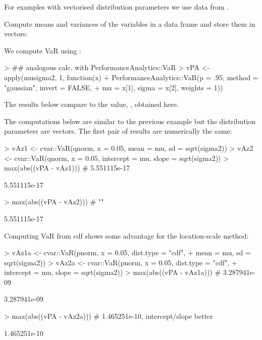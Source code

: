 \documentclass[nojss,article]{jss}
\begin{document}
For examples with vectorised distribution parameters we use data from
.

Compute means and variances of the variables in a data frame and store them in vectors:
\begin{Schunk}
\begin{Sinput}
> ## if(require("PerformanceAnalytics")){
> data(edhec, package = "PerformanceAnalytics")
> mu <- apply(edhec, 2, mean)
> sigma2 <- apply(edhec, 2, var)
> musigma2 <- cbind(mu, sigma2)
\end{Sinput}
\end{Schunk}

We compute VaR using :
\begin{Schunk}
\begin{Sinput}
> ## analogous calc. with PerformanceAnalytics::VaR
> vPA <- apply(musigma2, 1, function(x)
+     PerformanceAnalytics::VaR(p = .95, method = "gaussian", invert = FALSE,
+                               mu = x[1], sigma = x[2], weights = 1))
\end{Sinput}
\end{Schunk}
The results below compare to the value, , obtained here.

The computations below are similar to the previous example but the distribution parameters
are vectors. The first pair of results are numerically the same:
\begin{Schunk}
\begin{Sinput}
> vAz1 <- cvar::VaR(qnorm, x = 0.05, mean = mu, sd = sqrt(sigma2))
> vAz2 <- cvar::VaR(qnorm, x = 0.05, intercept = mu, slope = sqrt(sigma2))
> max(abs((vPA - vAz1))) # 5.551115e-17
\end{Sinput}
\begin{Soutput}
[1] 5.551115e-17
\end{Soutput}
\begin{Sinput}
> max(abs((vPA - vAz2))) #   ""
\end{Sinput}
\begin{Soutput}
[1] 5.551115e-17
\end{Soutput}
\end{Schunk}

Computing VaR from cdf shows some advantage for the location-scale method:
\begin{Schunk}
\begin{Sinput}
> vAz1a <- cvar::VaR(pnorm, x = 0.05, dist.type = "cdf",
+                    mean = mu, sd = sqrt(sigma2))
> vAz2a <- cvar::VaR(pnorm, x = 0.05, dist.type = "cdf",
+                    intercept = mu, slope = sqrt(sigma2))
> max(abs((vPA - vAz1a))) # 3.287941e-09
\end{Sinput}
\begin{Soutput}
[1] 3.287941e-09
\end{Soutput}
\begin{Sinput}
> max(abs((vPA - vAz2a))) #  1.465251e-10, intercept/slope better
\end{Sinput}
\begin{Soutput}
[1] 1.465251e-10
\end{Soutput}
\end{Schunk}
\end{document}

